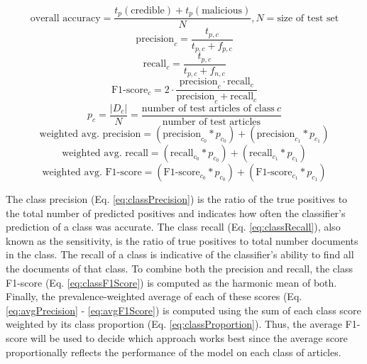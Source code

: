 \begin{equation}
\label{eq:overallAccuracy}
\mbox{overall accuracy} = \frac{t_{p}(\mbox{credible}) + t_{p}(\mbox{malicious})}{N}, N = \mbox{size of test set}
\end{equation}
\begin{equation}
\label{eq:classPrecision}
\mbox{precision}_{c} = \frac{t_{p, c}}{t_{p, c} + f_{p, c}}
\end{equation}
\begin{equation}
\label{eq:classRecall}
\mbox{recall}_{c} = \frac{t_{p, c}}{t_{p, c} + f_{n, c}}
\end{equation}
\begin{equation}
\label{eq:classF1Score}
\mbox{F1-score}_{c} = 2 \cdot \frac{\mbox{precision}_{c} \cdot \mbox{recall}_{c}}{\mbox{precision}_{c} + \mbox{recall}_{c}}
\end{equation}
\begin{equation}
\label{eq:classProportion}
p_{c} = \frac{|D_{c}|}{N} = \frac{\mbox{number of test articles of class}\ c}{\mbox{number of test articles}}
\end{equation}
\begin{equation}
\label{eq:avgPrecision}
\mbox{weighted avg. precision} = (\mbox{precision}_{c_{0}}*p_{c_{0}}) + (\mbox{precision}_{c_{1}}*p_{c_{1}})
\end{equation}
\begin{equation}
\label{eq:avgRecall}
\mbox{weighted avg. recall} = (\mbox{recall}_{c_{0}}*p_{c_{0}}) + (\mbox{recall}_{c_{1}}*p_{c_{1}})
\end{equation}
\begin{equation}
\label{eq:avgF1Score}
\mbox{weighted  avg. F1-score} = (\mbox{F1-score}_{c_{0}}*p_{c_{0}}) + (\mbox{F1-score}_{c_{1}}*p_{c_{1}})
\end{equation}


The class precision (Eq. \ref{eq:classPrecision}) is the ratio of the true positives to the total number of predicted positives and indicates how often the classifier's prediction of a class was accurate.  The class recall (Eq. \ref{eq:classRecall}), also known as the sensitivity, is the ratio of true positives to total number documents in the class.  The recall of a class is indicative of the classifier's ability to find all the documents of that class.  To combine both the precision and recall, the class F1-score (Eq. \ref{eq:classF1Score}) is computed as the harmonic mean of both.  Finally, the prevalence-weighted average of each of these scores (Eq. \ref{eq:avgPrecision} - \ref{eq:avgF1Score}) is computed using the sum of each class score weighted by its class proportion (Eq. \ref{eq:classProportion}).  Thus, the average F1-score will be used to decide which approach works best since the average score proportionally reflects the performance of the model on each class of articles.


